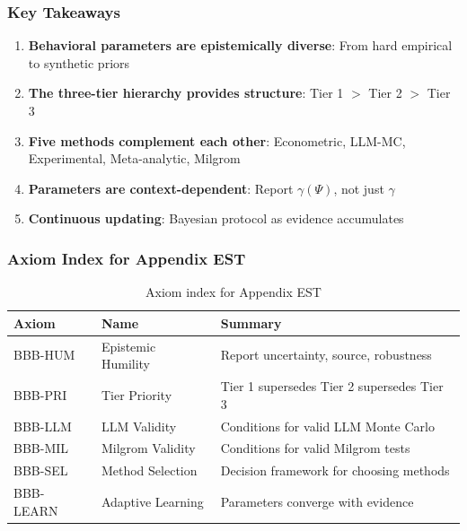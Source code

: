 \subsubsection{Key Takeaways}

\begin{enumerate}
    \item \textbf{Behavioral parameters are epistemically diverse}: From hard empirical to 
    synthetic priors
    \item \textbf{The three-tier hierarchy provides structure}: Tier 1 $>$ Tier 2 $>$ Tier 3
    \item \textbf{Five methods complement each other}: Econometric, LLM-MC, Experimental, 
    Meta-analytic, Milgrom
    \item \textbf{Parameters are context-dependent}: Report $\gamma(\Psi)$, not just $\gamma$
    \item \textbf{Continuous updating}: Bayesian protocol as evidence accumulates
\end{enumerate}

\subsubsection{Axiom Index for Appendix EST}

\begin{table}[h]
\centering
\small
\begin{tabular}{lll}
\toprule
\textbf{Axiom} & \textbf{Name} & \textbf{Summary} \\
\midrule
BBB-HUM & Epistemic Humility & Report uncertainty, source, robustness \\
BBB-PRI & Tier Priority & Tier 1 supersedes Tier 2 supersedes Tier 3 \\
BBB-LLM & LLM Validity & Conditions for valid LLM Monte Carlo \\
BBB-MIL & Milgrom Validity & Conditions for valid Milgrom tests \\
BBB-SEL & Method Selection & Decision framework for choosing methods \\
BBB-LEARN & Adaptive Learning & Parameters converge with evidence \\
\bottomrule
\end{tabular}
\caption{Axiom index for Appendix EST}
\label{tab:bbb-axioms}
\end{table}


